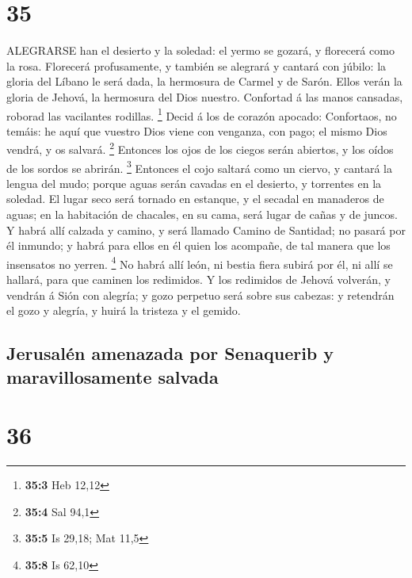 \hypertarget{section-34}{%
\section{35}\label{section-34}}

 ALEGRARSE han el desierto y la soledad: el yermo se gozará,
y florecerá como la rosa.  Florecerá profusamente, y también
se alegrará y cantará con júbilo: la gloria del Líbano le será dada, la
hermosura de Carmel y de Sarón. Ellos verán la gloria de Jehová, la
hermosura del Dios nuestro.  Confortad á las manos cansadas,
roborad las vacilantes rodillas. \footnote{\textbf{35:3} Heb 12,12}
 Decid á los de corazón apocado: Confortaos, no temáis: he
aquí que vuestro Dios viene con venganza, con pago; el mismo Dios
vendrá, y os salvará. \footnote{\textbf{35:4} Sal 94,1} 
Entonces los ojos de los ciegos serán abiertos, y los oídos de los
sordos se abrirán. \footnote{\textbf{35:5} Is 29,18; Mat 11,5}
 Entonces el cojo saltará como un ciervo, y cantará la
lengua del mudo; porque aguas serán cavadas en el desierto, y torrentes
en la soledad.  El lugar seco será tornado en estanque, y el
secadal en manaderos de aguas; en la habitación de chacales, en su cama,
será lugar de cañas y de juncos.  Y habrá allí calzada y
camino, y será llamado Camino de Santidad; no pasará por él inmundo; y
habrá para ellos en él quien los acompañe, de tal manera que los
insensatos no yerren. \footnote{\textbf{35:8} Is 62,10}  No
habrá allí león, ni bestia fiera subirá por él, ni allí se hallará, para
que caminen los redimidos.  Y los redimidos de Jehová
volverán, y vendrán á Sión con alegría; y gozo perpetuo será sobre sus
cabezas: y retendrán el gozo y alegría, y huirá la tristeza y el gemido.

\hypertarget{jerusaluxe9n-amenazada-por-senaquerib-y-maravillosamente-salvada}{%
\subsection{Jerusalén amenazada por Senaquerib y maravillosamente
salvada}\label{jerusaluxe9n-amenazada-por-senaquerib-y-maravillosamente-salvada}}

\hypertarget{section-35}{%
\section{36}\label{section-35}}

